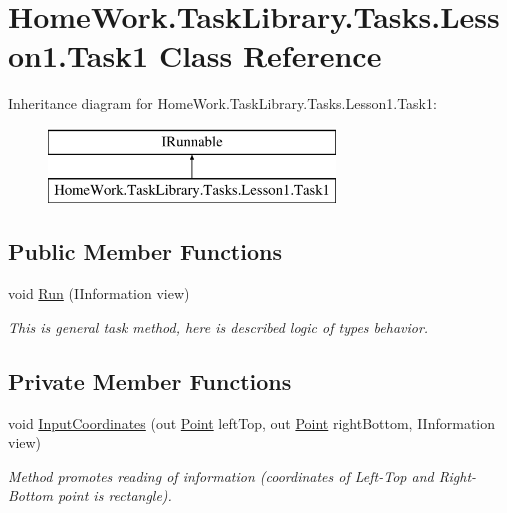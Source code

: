 \hypertarget{class_home_work_1_1_task_library_1_1_tasks_1_1_lesson1_1_1_task1}{}\section{Home\+Work.\+Task\+Library.\+Tasks.\+Lesson1.\+Task1 Class Reference}
\label{class_home_work_1_1_task_library_1_1_tasks_1_1_lesson1_1_1_task1}
Inheritance diagram for Home\+Work.\+Task\+Library.\+Tasks.\+Lesson1.\+Task1\+:\begin{figure}[H]
\begin{center}
\leavevmode
\includegraphics[height=2.000000cm]{class_home_work_1_1_task_library_1_1_tasks_1_1_lesson1_1_1_task1}
\end{center}
\end{figure}
\subsection*{Public Member Functions}
\begin{DoxyCompactItemize}
\item 
void \mbox{\hyperlink{class_home_work_1_1_task_library_1_1_tasks_1_1_lesson1_1_1_task1_ab31faf6e7444a60325c64ff0421ac8e1}{Run}} (I\+Information view)
\begin{DoxyCompactList}\small\item\em This is general task method, here is described logic of types behavior. \end{DoxyCompactList}\end{DoxyCompactItemize}
\subsection*{Private Member Functions}
\begin{DoxyCompactItemize}
\item 
void \mbox{\hyperlink{class_home_work_1_1_task_library_1_1_tasks_1_1_lesson1_1_1_task1_a170b0df26436b580a22e3a5c2ec9639a}{Input\+Coordinates}} (out \mbox{\hyperlink{struct_home_work_1_1_task_library_1_1_tasks_1_1_lesson1_1_1_classes_1_1_point}{Point}} left\+Top, out \mbox{\hyperlink{struct_home_work_1_1_task_library_1_1_tasks_1_1_lesson1_1_1_classes_1_1_point}{Point}} right\+Bottom, I\+Information view)
\begin{DoxyCompactList}\small\item\em Method promotes reading of information (coordinates of Left-\/\+Top and Right-\/\+Bottom point is rectangle). \end{DoxyCompactList}\end{DoxyCompactItemize}


